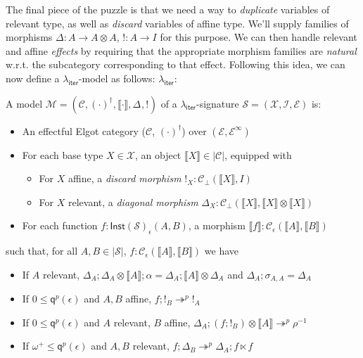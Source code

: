 \documentclass[acmsmall,screen,anonymous,review]{acmart}
\newcommand{\mc}[1]{\ensuremath{\mathcal{#1}}}
\newcommand{\ms}[1]{\ensuremath{\mathsf{#1}}}
\newcommand{\cref}{\twoheadrightarrow}
\newcommand{\dnt}[1]{\llbracket{#1}\rrbracket}
\newcommand{\tmor}[1]{{!}_{#1}}
\newcommand{\dmor}[1]{{\Delta}_{#1}}
\newcommand{\subiterexp}{\texorpdfstring{\(\lambda_{\ms{iter}}\)}{lambda-iter}}
\newcommand{\zeroq}{0}
\newcommand{\cpyq}{\omega^+}
\newcommand{\alquant}{\ms{q}}
\begin{document}
The final piece of the puzzle is that we need a way to \emph{duplicate} variables of relevant type,
as well as \emph{discard} variables of affine type. We'll supply families of morphisms $\Delta: A
\to A \otimes A$, $!: A \to I$ for this purpose. We can then handle relevant and affine
\emph{effects} by requiring that the appropriate morphism families are \emph{natural} w.r.t. the
subcategory corresponding to that effect. Following this idea, we can now define a \subiterexp-model
as follows: \subiterexp{}:
\begin{definition}[\subiterexp-model]
  A model $\mc{M} = (\mc{C}, (\cdot)^\dagger, \dnt{\cdot}, \dmor{}, \tmor{})$ of a
  \subiterexp-signature $\mc{S} = (\mc{X}, \mc{I}, \mc{E})$ is:
  \begin{itemize}
    \item An effectful Elgot category ($\mc{C}$, $(\cdot)^\dagger$) over $(\mc{E},
    \mc{E}^\infty)$
    \item For each base type $X \in \mc{X}$, an object $\dnt{X} \in |\mc{C}|$, equipped with
    \begin{itemize}
      \item For $X$ affine, a \emph{discard morphism} $\tmor{X} : \mc{C}_\bot(\dnt{X}, I)$
      \item For $X$ relevant, a \emph{diagonal morphism} $\dmor{X} : \mc{C}_\bot(\dnt{X}, \dnt{X}
      \otimes \dnt{X})$
    \end{itemize}
    \item For each function $f : \ms{Inst}(\mc{S})_\epsilon(A, B)$, a morphism $\dnt{f} :
    \mc{C}_\epsilon(\dnt{A}, \dnt{B})$
  \end{itemize}
  such that, for all $A, B \in |\mc{S}|$, $f : \mc{C}_\epsilon(\dnt{A}, \dnt{B})$ we have
  \begin{itemize}
    \item If $A$ relevant, 
      $\dmor{A} ; \dmor{A} \otimes \dnt{A} ; \alpha = \dmor{A} ; \dnt{A} \otimes \dmor{A}$
      and
      $\dmor{A} ; \sigma_{A, A} = \dmor{A}$
    \item If $\zeroq \leq \alquant^p(\epsilon)$ and $A, B$ affine, $f ; \tmor{B} \cref^p \tmor{A}$
    \item If $\zeroq \leq \alquant^p(\epsilon)$ and $A$ relevant, $B$ affine, 
      $\dmor{A} ; (f ; \tmor{B}) \otimes \dnt{A} \cref^p \rho^{-1}$
    \item If $\cpyq \leq \alquant^p(\epsilon)$ and $A, B$ relevant, 
    $f ; \dmor{B} \cref^p \dmor{A} ; f \ltimes f$
  \end{itemize}

\end{definition}
\end{document}
